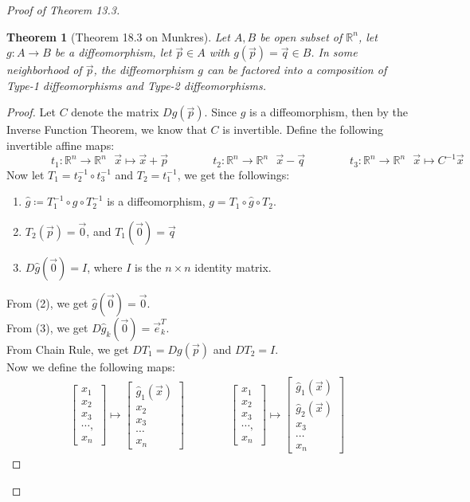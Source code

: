 \documentclass[11pt,oneside]{book}
\theoremstyle{break}
\theoremstyle{break}
\newtheorem{thm}{Theorem}[section]
\newcommand{\R}{\mathbb{R}}
\newcommand{\bmat}[1]{\begin{bmatrix} #1 \end{bmatrix}}
\begin{document}
\begin{proof}[Proof of Theorem 13.3]
\begin{thm}[Theorem 18.3 on Munkres]\setlength{\leftskip}{1cm}
Let $A,B$ be open subset of $\R^n$, let $g:A \to B$ be a diffeomorphism, let $\vec{p}\in A$ with $g(\vec{p}) = \vec{q}\in B$. In some neighborhood of $\vec{p}$, the diffeomorphism $g$ can be factored into a composition of Type-1 diffeomorphisms and Type-2 diffeomorphisms. 
\end{thm}
\begin{proof}\setlength{\leftskip}{1cm}
Let $C$ denote the matrix $Dg(\vec{p})$. Since $g$ is a diffeomorphism, then by the Inverse Function Theorem, we know that $C$ is invertible. Define the following invertible affine maps:
$$\qquad\qquad t_1:\R^n \to \R^n\ \ \ \vec{x}\mapsto\vec{x}+\vec{p} \qquad\qquad t_2:\R^n \to \R^n \ \ \ \vec{x}-\vec{q}\qquad\qquad t_3:\R^n \to \R^n \ \ \ \vec{x}\mapsto C^{-1}\vec{x}$$
Now let $T_1=t_2^{-1}\circ t_3^{-1}$ and $T_2=t_1^{-1}$, we get the followings:
\begin{enumerate}[topsep=3pt,itemsep=-1ex,partopsep=1ex,parsep=1ex,leftmargin=1.5cm]
\item $\hat{g} \coloneqq T_1^{-1} \circ g \circ T_2^{-1}$ is a diffeomorphism, $g = T_1 \circ \hat{g} \circ T_2$.
\item $T_2(\vec{p}) = \vec{0}$, and $T_1(\vec{0}) = \vec{q}$
\item $D\hat{g}(\vec{0}) = I $, where $I$ is the $n \times n$ identity matrix.
\end{enumerate}
From (2), we get $\hat{g}(\vec{0}) = \vec{0}$. \\
From (3), we get $D\hat{g}_k(\vec{0}) = \vec{e}_k^T$.\\
From Chain Rule, we get $DT_1= Dg(\vec{p})$ and $DT_2 = I$. \\ 
Now we define the following maps:
\begin{align*}
\qquad\qquad
\bmat{x_1\\x_2\\x_3\\\cdots,\\x_n} \mapsto \bmat{\hat{g}_1(\vec{x})\\x_2\\x_3\\\cdots \\x_n} \qquad\qquad
\bmat{x_1\\x_2\\x_3\\\cdots,\\x_n}\mapsto \bmat{\hat{g}_1(\vec{x})\\\hat{g}_2(\vec{x})\\x_3\\\cdots\\ x_n} \qquad\qquad

\end{align*}
\end{proof}
\end{proof}
\end{document}
